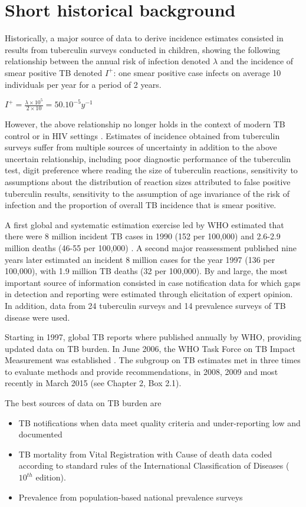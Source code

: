 \section{Short historical background}

Historically, a major source of data to derive incidence estimates consisted in results from tuberculin surveys conducted in children\cite{Styblo1985}, showing the following relationship between the annual risk of infection denoted $\lambda$ and the incidence of smear positive TB denoted $I^+$: one smear positive case infects on average 10 individuals per year for a period of 2 years.

$I^+ = \frac{\lambda \times 10^5}{2 \times 10} = 50.10^{-5} y^{-1}$

However, the above relationship no longer holds in the context of modern TB control or in HIV settings \cite{18235886}. Estimates of incidence obtained from tuberculin surveys suffer from multiple sources of uncertainty in addition to the above uncertain relationship, including poor diagnostic performance of the tuberculin test, digit preference where reading the size of tuberculin reactions, sensitivity to assumptions about the distribution of reaction sizes attributed to false positive tuberculin results, sensitivity to the assumption of age invariance of the risk of infection and the proportion of overall TB incidence that is smear positive. 

A first global and systematic estimation exercise led by WHO estimated that there were 8 million incident TB cases in 1990 (152 per 100,000) and 2.6-2.9 million deaths (46-55 per 100,000) \cite{1600578}. A second major reassessment published nine years later \cite{10517722} estimated an incident 8 million cases for the year 1997 (136 per 100,000), with 1.9 million TB deaths (32 per 100,000). By and large, the most important source of information consisted in case notification data for which gaps in detection and reporting were estimated through elicitation of expert opinion. In addition, data from 24 tuberculin surveys and 14 prevalence surveys of TB disease were used.

Starting in 1997, global TB reports where published annually by WHO, providing updated data on TB burden. In June 2006, the WHO Task Force on TB Impact Measurement was established \cite{18201929}. The subgroup on TB estimates met in three times to evaluate methods and provide recommendations, in 2008, 2009 and most recently in March 2015 (see Chapter 2, Box 2.1).

The best sources of data on TB burden are 
\begin{itemize}
\item TB notifications when data meet quality criteria and under-reporting low and documented
\item TB mortality from Vital Registration with Cause of death data coded according to standard rules of the International Classification of Diseases ($10^{th}$ edition).
\item Prevalence from population-based national prevalence surveys
\end{itemize}




  
  
  
  
  
  
  
  
  
  
  